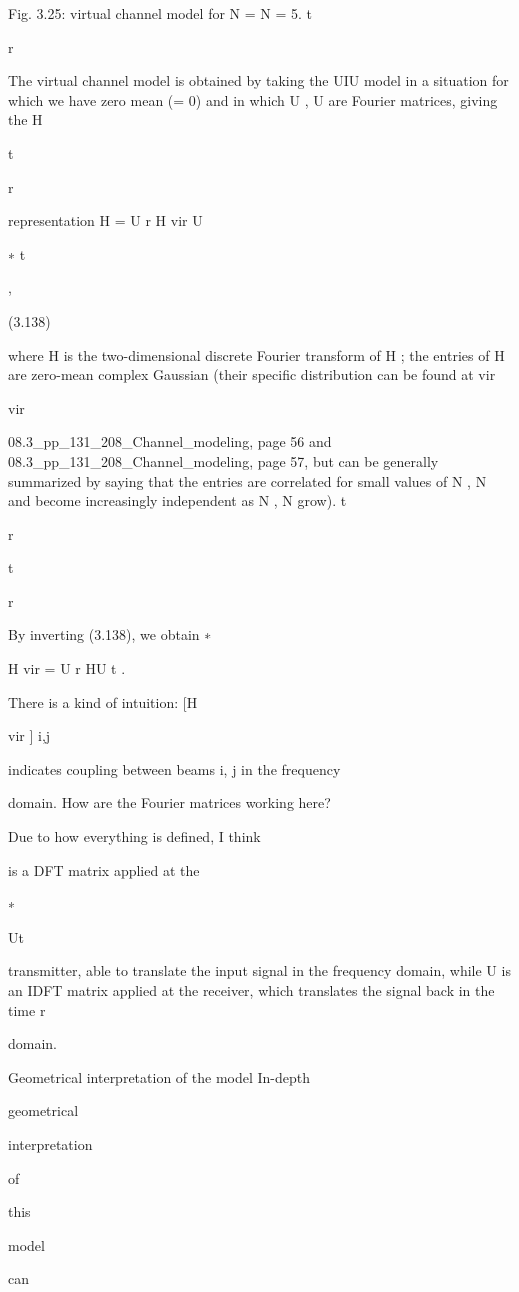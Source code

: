 {{{{Fig. 3.25: virtual channel model for N = N = 5.
t

r

The virtual channel model is obtained by taking the UIU model in a situation for which we have zero mean (\mu = 0) and in which U , U are Fourier matrices, giving the H

t

r

representation H = U r H vir U

∗
t

,

(3.138)

where H is the two-dimensional discrete Fourier transform of H ; the entries of H are zero-mean complex Gaussian (their specific distribution can be found at vir

vir

08.3_pp_131_208_Channel_modeling, page 56 and 08.3_pp_131_208_Channel_modeling,
page 57, but can be generally summarized by saying that the entries are correlated for small values of N , N and become increasingly independent as N , N grow).
t

r

t

r

By inverting (3.138), we obtain
∗

H vir = U r HU t .

There is a kind of intuition: [H

vir ] i,j

indicates coupling between beams i, j in the frequency

domain.
​How are the Fourier matrices working here?

Due to how everything is defined, I think

is a DFT matrix applied at the

∗

Ut

transmitter, able to translate the input signal in the frequency domain, while U is an IDFT matrix applied at the receiver, which translates the signal back in the time r

domain.

Geometrical interpretation of the model In-depth

geometrical

interpretation

of

this

model

can

}}}}
